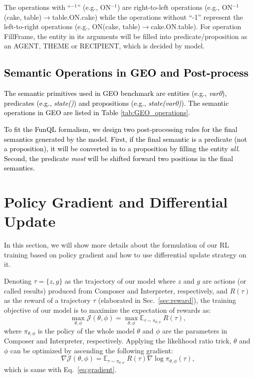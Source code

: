 \documentclass[11pt,a4paper]{article}
\newcommand{\An}[1]{\textcolor{black}{#1}}
\begin{document}
The operations with ``$^{-1}$'' (e.g., ON$^{-1}$) are right-to-left operations (e.g., ON$^{-1}$(cake, table)$\rightarrow$table.ON.cake) while the operations without ``-1'' represent the left-to-right operations (e.g., ON(cake, table)$\rightarrow$cake.ON.table).
For operation FillFrame, the entity in its arguments will be filled into predicate/proposition as an AGENT, THEME or RECIPIENT, which is decided by model.

\An{\section{Semantic Operations in GEO and Post-process}}

\An{The semantic primitives used in GEO benchmark are entities (e.g., \textit{var0}), predicates (e.g., \textit{state()}) and propositions (e.g., \textit{state(var0)}).
The semantic operations in GEO are listed in Table \ref{tab:GEO_operations}.}

\An{To fit the FunQL formalism, we design two post-processing rules for the final semantics generated by the model.
First, if the final semantic is a predicate (not a proposition), it will be converted in to a proposition by filling the entity \textit{all}. 
Second, the predicate \textit{most} will be shifted forward two positions in the final semantics.}





\section{Policy Gradient and Differential Update}

In this section, we will show more details about the formulation of our RL training based on policy gradient and how to use differential update strategy on it.

Denoting $\tau = \{z, g\}$ as the trajectory of our model where $z$ and $g$ are actions (or called results) produced from Composer and Interpreter, respectively, and $R(\tau)$ as the reward of a trajectory $\tau$ (elaborated in Sec.~\ref{sec:reward}), 
the training objective of our model is to maximize the expectation of rewards as:
\begin{equation}
    \max_{\theta, \phi} \mathcal{J}(\theta, \phi)
    =\max_{\theta, \phi} \mathbb{E}_{\tau \sim {\pi}_{\theta, \phi }}\;R(\tau),
\end{equation}
where ${\pi}_{\theta, \phi }$ is the policy of the whole model $\theta$ and $\phi$ are the parameters in Composer and Interpreter, respectively.
Applying the likelihood ratio trick, $\theta$ and $\phi$ can be optimized by ascending the following gradient:
\begin{equation*}
    \nabla \mathcal{J}(\theta, \phi)=\mathbb{E}_{\tau \sim {\pi}_{\theta, \phi}}\;R(\tau)\nabla \log \pi_{\theta, \phi}\left(\tau\right),
\end{equation*}
which is same with Eq.~\ref{eq:gradient}.
\end{document}
